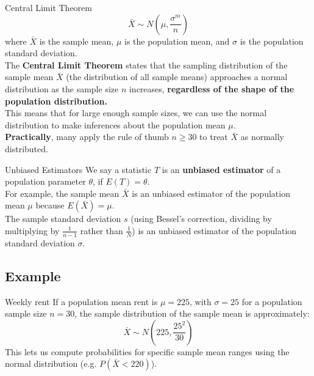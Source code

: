 \documentclass[9pt]{extarticle}
\begin{document}
\begin{definitionbox}{Central Limit Theorem}{}
    $$\bar{X} \sim N\left(\mu, \frac{\sigma^m}{n}\right)$$
    where $\bar{X}$ is the sample mean, $\mu$ is the population mean, and $\sigma$ is the population standard deviation.\\

    The \textbf{Central Limit Theorem} states that the sampling distribution of the sample mean $\bar{X}$ (the distribution of all sample means)  approaches a normal distribution as the sample size $n$ increases, \textbf{regardless of the shape of the population distribution.}\\

    This means that for large enough sample sizes, we can use the normal distribution to make inferences about the population mean $\mu$. \\

    \textbf{Practically}, many apply the rule of thumb $n \geq 30$ to treat $\bar{X}$ as normally distributed.
\end{definitionbox}


\begin{definitionbox}{Unbiased Estimators}{}
    We say a statistic $T$ is an \textbf{unbiased estimator} of a population parameter $\theta$,  if $E(T) = \theta$.\\

    For example, the sample mean $\bar{X}$ is an unbiased estimator of the population mean $\mu$ because $E(\bar{X}) = \mu$.\\

    The sample standard deviation $s$ (using Bessel's correction, dividing by multiplying by $\frac{1}{n-1}$ rather than $\frac{1}{N}$) is an unbiased estimator of the population standard deviation $\sigma$.
\end{definitionbox}

\subsection{Example}
\begin{examplebox}{Weekly rent}{}
    If a population mean rent is $\mu = 225$, with $\sigma = 25$ for a population sample size $n = 30$, the sample distribution of the sample mean is approximately:
    $$\bar{X} \sim N\left(225, \frac{25^2}{30}\right)$$
    This lets us compute probabilities for specific sample mean ranges using the normal distribution (e.g. $P(\bar{X} < 220)$).
\end{examplebox}
\end{document}

